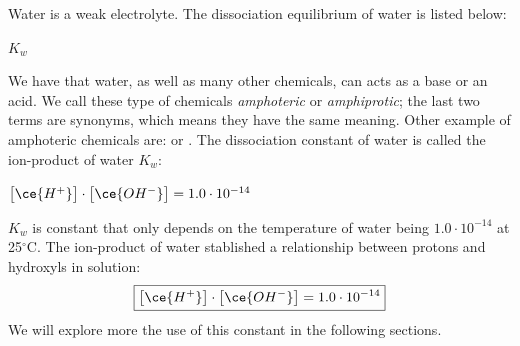 \documentclass[main.tex]{subfiles}
\newcommand\chapterlabel{acids}
\begin{document}
\begin{description}
Water is a weak electrolyte.
The dissociation equilibrium of water is listed below:
\begin{center}\hfill $K_w$\end{center}
We have that water, as well as many other chemicals, can acts as a base or an acid. We call these type of chemicals \emph{amphoteric} or \emph{amphiprotic}; the last two terms are synonyms, which means they have the same meaning. Other example of amphoteric chemicals are:  or . The dissociation constant of water is called the ion-product of water $K_w$:
\begin{center} \hspace{1cm} $\big[ \ce{H^+} \big] \cdot \big[ \ce{OH^-} \big]=1.0\cdot 10^{-14}$\end{center}
$K_w$ is constant that only depends on the temperature of water being $1.0\cdot 10^{-14}$ at 25$^\circ$C. The ion-product of water stablished a relationship between protons and hydroxyls in solution:
\begin{equation}
\boxed{ \big[ \ce{H^+} \big] \cdot \big[ \ce{OH^-} \big]=1.0\cdot 10^{-14}    }\label{\chapterlabel:equation2}
\end{equation}
We will explore more the use of this constant in the following sections.








\end{description}
\end{document}
